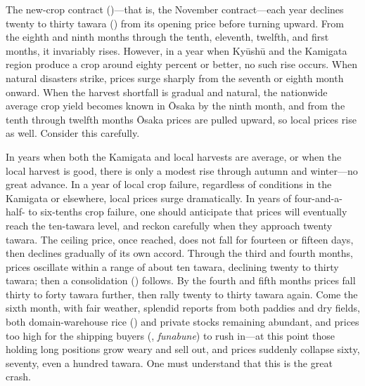 
\begin{sokyubox}
{\small\itshape\color{sokyubar} }

\medskip
The new-crop contract ()---that is, the November
contract---each year declines twenty to thirty tawara
() from its opening price before turning upward. From
the eighth and ninth months through the tenth, eleventh, twelfth, and
first months, it invariably rises. However, in a year when Ky\=ush\=u
and the Kamigata region produce a crop around eighty percent or better,
no such rise occurs. When natural disasters strike, prices surge sharply
from the seventh or eighth month onward. When the harvest shortfall is
gradual and natural, the nationwide average crop yield becomes known in
\=Osaka by the ninth month, and from the tenth through twelfth months
\=Osaka prices are pulled upward, so local prices rise as well. Consider
this carefully.

In years when both the Kamigata and local harvests are average, or when
the local harvest is good, there is only a modest rise through autumn
and winter---no great advance. In a year of local crop failure,
regardless of conditions in the Kamigata or elsewhere, local prices
surge dramatically. In years of four-and-a-half- to six-tenths crop
failure, one should anticipate that prices will eventually reach the
ten-tawara level, and reckon carefully when they approach twenty tawara.
The ceiling price, once reached, does not fall for fourteen or fifteen
days, then declines gradually of its own accord. Through the third and
fourth months, prices oscillate within a range of about ten tawara,
declining twenty to thirty tawara; then a consolidation ()
follows. By the fourth and fifth months prices fall thirty to forty
tawara further, then rally twenty to thirty tawara again. Come the sixth
month, with fair weather, splendid reports from both paddies and dry
fields, both domain-warehouse rice () and private
stocks remaining abundant, and prices too high for the shipping buyers
(, \textit{funabune}) to rush in---at this point those holding
long positions grow weary and sell out, and prices suddenly collapse
sixty, seventy, even a hundred tawara. One must understand that this is
the great crash.
\end{sokyubox}


